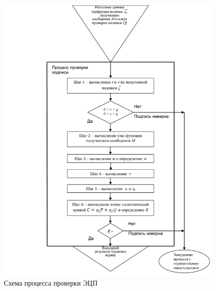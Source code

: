 \begin{figure}[H]
	\centering
	\includegraphics[width=1.0\linewidth]{inc/img/4_2}
	\caption{Схема процесса проверки ЭЦП}
	\label{fig:fig4_2}
\end{figure}